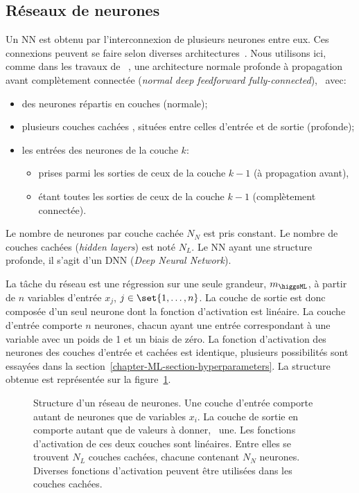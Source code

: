 \subsection{Réseaux de neurones}\label{chapter-ML-section-DNN-networks}
Un NN est obtenu par l'interconnexion de plusieurs neurones entre eux.
Ces connexions peuvent se faire selon diverses architectures~\cite{DNN}.
Nous utilisons ici,
comme dans les travaux de \citeauthor{BARTSCHI201929}~\cite{BARTSCHI201929},
une architecture
normale profonde à propagation avant complètement connectée (\emph{normal deep feedforward fully-connected}),
\ie\ avec:
\begin{itemize}
\item des neurones répartis en couches (normale);
\item plusieurs couches \og cachées \fg, situées entre celles d'entrée et de sortie (profonde);
\item les entrées des neurones de la couche $k$:
\begin{itemize}
\item prises parmi les sorties de ceux de la couche $k-1$ (à propagation avant),
\item étant toutes les sorties de ceux de la couche $k-1$ (complètement connectée).
\end{itemize}
\end{itemize}
Le nombre de neurones par couche cachée $N_N$ est pris constant.
Le nombre de couches cachées (\emph{hidden layers}) est noté $N_L$.
Le NN ayant une structure profonde, il s'agit d'un DNN (\emph{Deep Neural Network}).
\par
La tâche du réseau est une régression sur une seule grandeur, $m_{\higgsML}$, à partir de $n$ variables d'entrée $x_j$, $j\in\set{1,\ldots,n}$.
La couche de sortie est donc composée d'un seul neurone dont la fonction d'activation est linéaire.
La couche d'entrée comporte $n$ neurones, chacun ayant une entrée correspondant à une variable avec un poids de 1 et un biais de zéro.
La fonction d'activation des neurones des couches d'entrée et cachées est identique, plusieurs possibilités sont essayées dans la section~\ref{chapter-ML-section-hyperparameters}.
La structure obtenue est représentée sur la figure~\ref{fig-neural_network_fr}.
\begin{figure}[h]
\centering

\caption[Structure d'un réseau de neurones.]{Structure d'un réseau de neurones. Une couche d'entrée comporte autant de neurones que de variables $x_i$. La couche de sortie en comporte autant que de valeurs à donner, \ie\ une. Les fonctions d'activation de ces deux couches sont linéaires. Entre elles se trouvent $N_L$ couches cachées, chacune contenant $N_N$ neurones. Diverses fonctions d'activation peuvent être utilisées dans les couches cachées.}
\label{fig-neural_network_fr}
\end{figure}